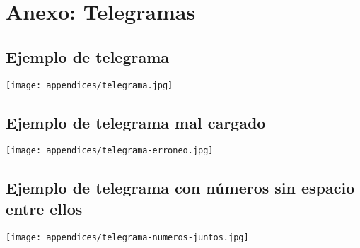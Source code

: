\chapter{Anexo: Telegramas}

\label{anexo:telegrama}
\section{Ejemplo de telegrama}

\texttt{[image: appendices/telegrama.jpg]}

\label{anexo:telegrama-erroneo}
\section{Ejemplo de telegrama mal cargado}

\texttt{[image: appendices/telegrama-erroneo.jpg]}

\label{anexo:telegrama-numeros-juntos}
\section{Ejemplo de telegrama con n\'umeros sin espacio entre ellos}

\texttt{[image: appendices/telegrama-numeros-juntos.jpg]}
